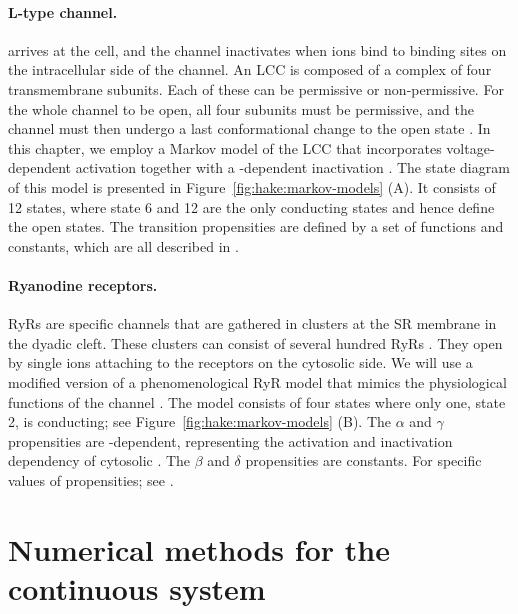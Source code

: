\paragraph{L-type \Ca channel.}
\label{sec:hake:lcc}

arrives at the cell, and the channel inactivates when \Ca ions bind to
binding sites on the intracellular side of the channel. An LCC is
composed of a complex of four transmembrane subunits. Each of these
can be permissive or non-permissive. For the whole channel to be open,
all four subunits must be permissive, and the channel must then
undergo a last conformational change to the open state
\citep{Hille2001}. In this chapter, we employ a Markov model of the LCC
that incorporates voltage-dependent activation together with a
\Ca-dependent inactivation
\citep{JafriRiceWinslow1998,GreensteinWinslow2002}. The state diagram
of this model is presented in Figure~\ref{fig:hake:markov-models}
(A). It consists of 12 states, where state 6 and 12 are the
only conducting states and hence define the open states. The
transition propensities are defined by a set of functions and
constants, which are all described in \citet{GreensteinWinslow2002}.

\paragraph{Ryanodine receptors.}
\label{sec:hake:ryr}

RyRs are \Ca specific channels that are gathered in clusters at the SR
membrane in the dyadic cleft. These clusters can consist of several
hundred RyRs
\citep{BeuckelmannWier1988,Franzini-ArmstrongProtasiRamesh1999}. They
open by single \Ca ions attaching to the receptors on the cytosolic
side. We will use a modified version of a phenomenological RyR model
that mimics the physiological functions of the channel
\citep{SternSongEtAl1999}. The model consists of four states where only
one, state 2, is conducting; see Figure~\ref{fig:hake:markov-models}
(B). The $\alpha$ and $\gamma$ propensities are \Ca-dependent,
representing the activation and inactivation dependency of cytosolic
\CaC. The $\beta$ and $\delta$ propensities are constants. For
specific values of propensities; see \citet{SternSongEtAl1999}.

\section{Numerical methods for the continuous system}

